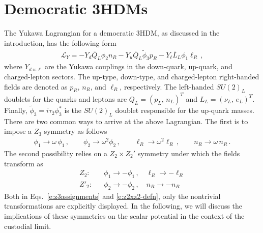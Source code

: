 \documentclass[11pt]{article}
\def\bar{\overline}
\def\tilde{\widetilde}
\begin{document}
\section{Democratic 3HDMs}
\label{s:democratic}
%

The Yukawa Lagrangian for a democratic 3HDM, as discussed in the introduction, has the following form
%
\begin{eqnarray}
	\label{e:d3hdmlyuk}
	\mathscr{L}_Y= - Y_d \bar{Q}_L\phi_2 n_R - Y_u \bar{Q}_L\tilde{\phi}_3 p_R - Y_\ell \bar{L }_L \phi_1 \ell_R \, ,
\end{eqnarray}
% 
where $Y_{d.u.\ell}$ are the Yukawa couplings in the down-quark, up-quark, and charged-lepton sectors.  
The up-type, down-type, and charged-lepton right-handed fields are denoted as $p_R$, $n_R$, and $\ell_R$, respectively.  
The left-handed $SU(2)_L$ doublets for the quarks and leptons are $Q_L = \left( p_L, \, n_L\right)^T$ and $L_L = \left( \nu_L, \, e_L\right)^T$.  
Finally, $\tilde{\phi}_3 = i \tau_2 \phi_3^*$ is the $SU(2)_L$ doublet responsible for the up-quark masses.
%
%
There are two common ways to arrive at the above Lagrangian.  
The first is to impose a $Z_3$ symmetry as follows~\cite{Das:2019yad}
%
%
\begin{eqnarray}
\label{e:z3assignments}
\phi_1 \to \omega \, \phi_1 \,, \qquad  \phi_2 \to \omega^2 \phi_2 \,,  \qquad	\ell_R \to \omega^2 \ell_R \,,  \qquad  n_R \to \omega \,n_R \,.  
\end{eqnarray}
% 
The second possibility relies on a $Z_2 \times Z_2'$ symmetry under which the fields transform as~\cite{Akeroyd:2016ssd}
%
\begin{subequations}
\label{e:z2xz2-defn}
\begin{eqnarray}
	\label{e:z2z2_scalars}
	Z_2:&&\phi_1 \to -\phi_1 \, , \quad  \ell_R \to -\ell_R \\
	Z'_2:&&\phi_2 \to -\phi_2 \, , \quad  n_R \to -n_R 
\end{eqnarray}
\end{subequations}
%
Both in Eqs.~\eqref{e:z3assignments} and \eqref{e:z2xz2-defn}, only the nontrivial transformations are explicitly displayed.
%
In the following, we will discuss the implications of these symmetries on the scalar potential in the context of the custodial limit.  
\end{document}
